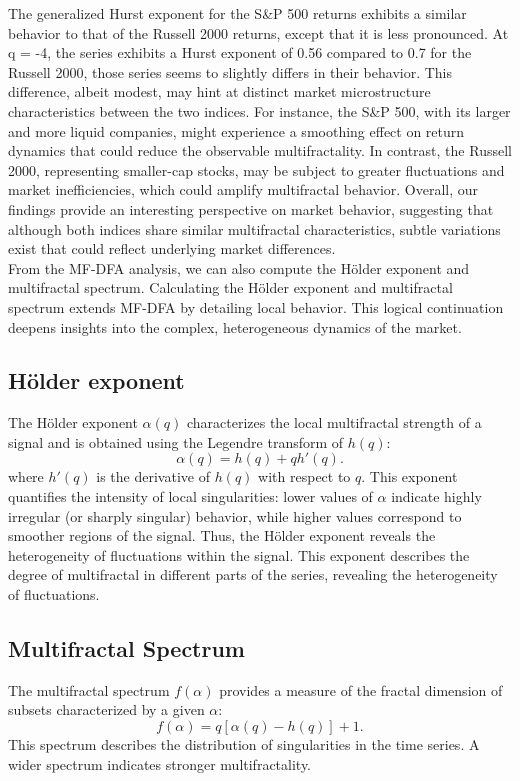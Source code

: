 \documentclass[11pt]{extarticle}
\begin{document}
The generalized Hurst exponent for the S\&P 500 returns exhibits a similar behavior to that of the Russell 2000 returns,
except that it is less pronounced. At q = -4, the series exhibits a Hurst exponent of 0.56 compared to 0.7 for the
Russell 2000, those series seems to slightly differs in their behavior.
This difference, albeit modest, may hint at distinct market microstructure characteristics between the two indices.
For instance, the S\&P 500, with its larger and more liquid companies, might experience a smoothing effect on return
dynamics that could reduce the observable multifractality. In contrast, the Russell 2000, representing smaller-cap
stocks, may be subject to greater fluctuations and market inefficiencies, which could amplify multifractal behavior.
Overall, our findings provide an interesting perspective on market behavior, suggesting that although both indices
share similar multifractal characteristics, subtle variations exist that could reflect underlying market differences. \\

From the MF-DFA analysis, we can also compute the Hölder exponent and multifractal spectrum.
Calculating the Hölder exponent and multifractal spectrum extends MF-DFA by detailing local behavior.
This logical continuation deepens insights into the complex, heterogeneous dynamics of the market. \\


\subsection{Hölder exponent}
The Hölder exponent $\alpha(q)$ characterizes the local multifractal strength of a signal and is obtained using the Legendre transform of $h(q)$:
\begin{equation}
\alpha(q) = h(q) + q h'(q).
\end{equation}
where $h'(q)$ is the derivative of $h(q)$ with respect to $q$. This exponent quantifies the intensity of local
singularities: lower values of $\alpha$ indicate highly irregular (or sharply singular) behavior, while higher
values correspond to smoother regions of the signal. Thus, the Hölder exponent reveals the heterogeneity of fluctuations within the signal.
This exponent describes the degree of multifractal in different parts of the series, revealing the heterogeneity of fluctuations.

\subsection{Multifractal Spectrum}
The multifractal spectrum $f(\alpha)$ provides a measure of the fractal dimension of subsets characterized by a given $\alpha$:
\begin{equation}
f(\alpha) = q [\alpha(q) - h(q)] + 1.
\end{equation}
This spectrum describes the distribution of singularities in the time series. A wider spectrum indicates stronger multifractality.
\end{document}
